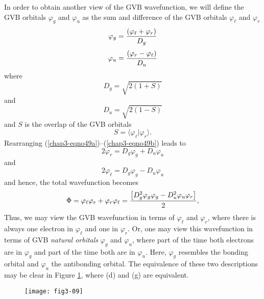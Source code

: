 In order to obtain another view of the GVB wavefunction, 
we will define the GVB orbitals  $\varphi_g$ and 
$\varphi_u$ as the sum and difference of the GVB orbitals 
$\varphi_\ell$ and $\varphi_r$
\begin{equation}
\varphi_g = {(\varphi_\ell + \varphi_r ) \over D_g}
\label{chap3-eqno49a}
\end{equation}
\begin{equation}
\varphi_u = {(\varphi_r - \varphi_\ell ) \over D_u}
\label{chap3-eqno49b}
\end{equation}
where
\begin{equation}
D_g = \sqrt{2(1+S)}
\label{chap3-eqno50a}
\end{equation}
and
\begin{equation}
D_u = \sqrt{2(1-S)}
\label{chap3-eqno50b}
\end{equation}
and $S$  is the overlap of the GVB orbitals
\begin{equation}
S = \langle \varphi_\ell \vert \varphi_r \rangle .
\end{equation}
Rearranging (\ref{chap3-eqno49a})--(\ref{chap3-eqno49b}) leads to
\begin{equation}
2 \varphi_r = D_g \varphi_g + D_u \varphi_u
\end{equation}
and
\begin{equation}
2 \varphi_\ell = D_g \varphi_g - D_u \varphi_u
\end{equation}
and hence, the total wavefunction becomes
\begin{equation}
\Phi = \varphi_\ell \varphi_r + \varphi_r \varphi_\ell = {\left[ D^2_g \varphi_g \varphi_g - 
D^2_u \varphi_u \varphi_r \right] \over 2} ,
\end{equation}
Thus, we may view the GVB wavefunction in terms of $\varphi_\ell$ and
$\varphi_r$, where there is always one electron in $\varphi_\ell$ and
one in $\varphi_r$.  Or, one may view this wavefunction in terms of
GVB \emph{natural orbitals} $\varphi_g$ and $\varphi_u$, where part of
the time both electrons are in $\varphi_g$ and part of the time both
are in $\varphi_u$.  Here, $\varphi_g$ resembles the bonding orbital
and $\varphi_u$ the antibonding orbital.  The equivalence of these two
descriptions may be clear in Figure \ref{fig3-10}, where (d) and (g)
are equivalent.

\begin{figure}
\texttt{[image: fig3-09]}
\caption{}
\label{fig3-10}
\end{figure}

